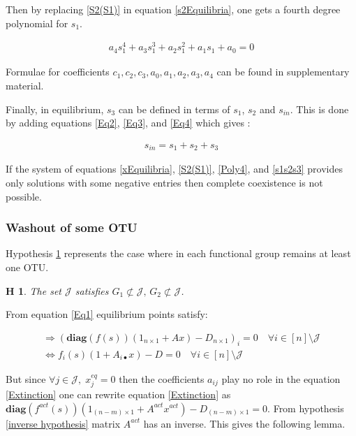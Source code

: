 \documentclass[3p,times]{article}
\newcommand{\diag}{\textbf{diag}}
\newtheorem{hypo}{H}
\begin{document}
Then by replacing  \eqref{S2(S1)} in equation \eqref{s2Equilibria}, one gets a fourth degree polynomial for $s_1$. 

\begin{align}
\label{Poly4} a_4s_1^4+a_3s_1^3+a_2s_1^2+a_1s_1+a_0 = 0
\end{align}


Formulae for coefficients $c_1, c_2, c_3, a_0, a_1, a_2, a_3, a_4$ can be found in supplementary material. 

Finally, in equilibrium, $s_3$ can be defined in terms of $s_1$, $s_2$ and $s_{in}$. This is done by adding equations \eqref{Eq2}, \eqref{Eq3},  and \eqref{Eq4} which gives :

\begin{align}
s_{in} = s_1+s_2+s_3 \label{s1s2s3}
\end{align}

If the system of equations \eqref{xEquilibria}, \eqref{S2(S1)}, \eqref{Poly4}, and \eqref{s1s2s3} provides only solutions with some negative entries then complete coexistence is not possible.

\subsubsection{Washout of some OTU}

Hypothesis \ref{hypothesis CN} represents the case where in each functional group remains at least one OTU.

\begin{hypo}The set $\mathcal{J}$ satisfies $ G_1 \not \subset \mathcal{J} , \, G_2 \not \subset \mathcal{J} $.
	\label{hypothesis CN}
\end{hypo} 

From equation \eqref{Eq1} equilibrium points satisfy: 

\begin{align}
\Rightarrow  (\diag (f(s))(1_{n\times 1}+ Ax) - D_{n\times 1})_i = 0 \quad \forall i \in [n]\setminus \mathcal{J} \\
\Leftrightarrow f_i(s)(1 + A_{i\bullet}x) - D = 0 \quad \forall i \in [n]\setminus \mathcal{J} \label{Extinction}
\end{align} 

But since $\forall j \in \mathcal{J}, \; x^{eq}_j = 0 $ then the coefficients $a_{ij}$ play no role in the equation \eqref{Extinction} one can rewrite equation \eqref{Extinction} as $\diag(f^{act}(s))(1_{(n-m)\times 1} + A^{act}x^{act}) - D_{(n-m) \times 1}=0 $. From hypothesis \ref{inverse hypothesis} matrix $A^{act}$ has an inverse. This gives the following lemma.
\end{document}
